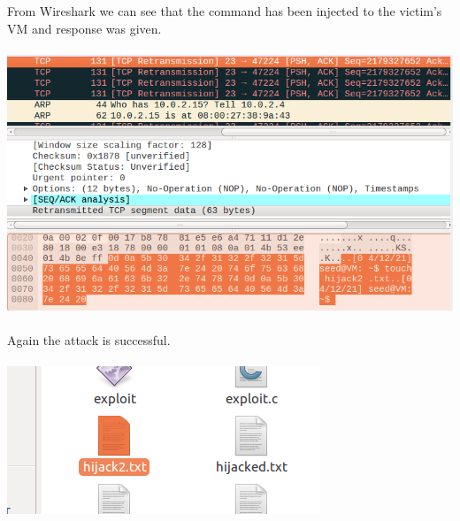 \documentclass[a4paper]{article}
\begin{document}
From Wireshark we can see that the command has been injected to the victim's VM and response was given.\\\\
\includegraphics[scale=0.7]{1/31.png}\\\\
Again the attack is successful.\\\\
\includegraphics[scale=0.7]{1/32.png}\\\\
\pagebreak
\end{document}
